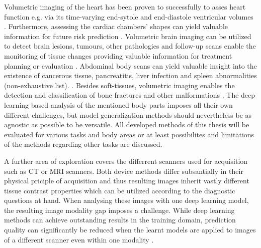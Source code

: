             Volumetric imaging of the heart has been proven to successfully to asses heart function e.g. via its time-varying end-sytole and end-diastole ventricular volumes
            \citep{pattynama1994evaluation}. %
            Furthermore, assessing the cardiac chambers' shapes can yield valuable information for future risk prediction
            \citep{ly2022interpretable}. %
            Volumetric brain imaging can be utilized to detect brain lesions, tumours, other pathologies
            \citep{
                hering2024improving, %
                uzunova2019unsupervised, %
            }
            and follow-up scans enable the monitoring of tissue changes providing valuable information for treatment planning or evaluation
            \citep{baheti2021brain}. %
            Abdominal body scans can yield valuable insight into the existence of cancerous tissue, pancreatitis, liver infection and spleen abnormalities (non-exhaustive list).
            \citep{caraiani2020indications}.
            Besides soft-tissues, volumetric imaging enables the detection and classification of bone fractures and other malformations \citep{kuo2022artificial}.
            The deep learning based analysis of the mentioned body parts imposes all their own different challenges, but model generalization methods should nevertheless be as agnostic as possible to be versatile. All developed methods of this thesis will be evaluated for various tasks and body areas or at least possibilites and limitations of the methods regarding other tasks are discussed.

            A further area of exploration covers the differrent scanners used for acquisition such as CT or MRI scanners. Both device methods differ subsantially in their physical priciple of acquisition and thus resulting images inherit vastly different tissue contrast properties which can be utilized according to the diagnostic questions at hand.
            When analysing these images with one deep learning model, the resulting image modality gap imposes a challenge. While deep learning methods can achieve outstanding results in the training domain, prediction quality can significantly be reduced when the learnt models are applied to images of a different scanner even within one modality \citep{pooch2020can}.

